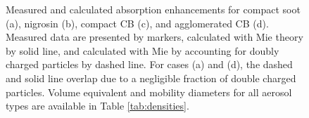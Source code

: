 \documentclass[12pt,authoryear]{elsarticle}
\providecommand{\DIFaddendFL}{} %
\providecommand{\DIFdelbeginFL}{} %
\begin{document}
\begin{figure}[htp]
{\begin{tikzpicture}
    \end{tikzpicture}}
    \DIFaddendFL \caption{Measured and calculated absorption enhancements for compact soot (a), nigrosin (b), compact CB (c), and agglomerated CB (d). Measured data are presented by markers, calculated with Mie theory by solid line, and calculated with Mie by accounting for doubly charged particles by dashed line. For cases (a) and (d), the dashed and solid line overlap due to a negligible fraction of double charged particles. Volume equivalent and mobility diameters for all aerosol types are available in Table \ref{tab:densities}.}
    \label{fig:mie_abs}
\end{figure}

\begin{figure}[htp]
    \centering
    \DIFdelbeginFL %

\end{figure}
\end{document}
